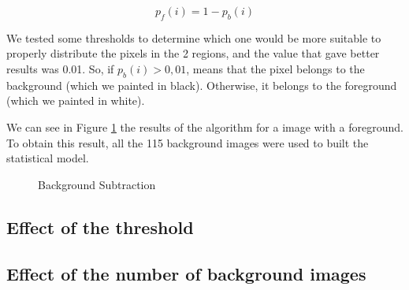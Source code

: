 \documentclass{article}
\begin{document}
	\begin{equation}
	 p_f(i)=1-p_b(i)  
	\end{equation}

	We tested some thresholds to determine which one would be more suitable to properly distribute the pixels in the 2 regions, and the value that gave better results was 0.01. So, if {$p_b(i)>0,01$}, means that the pixel belongs to the background (which we painted in black). Otherwise, it belongs to the foreground (which we painted in white). 

	We can see in Figure \ref{fig:img_000053} the results of the algorithm for a image with a foreground. To obtain this result, all the 115 background images were used to built the statistical model.

	\begin{figure}[H]
		  \centering
		  \caption{Background Subtraction}
		  \label{fig:img_000053}
	\end{figure}

\subsection{Effect of the threshold}

\subsection{Effect of the number of background images}
\end{document}
